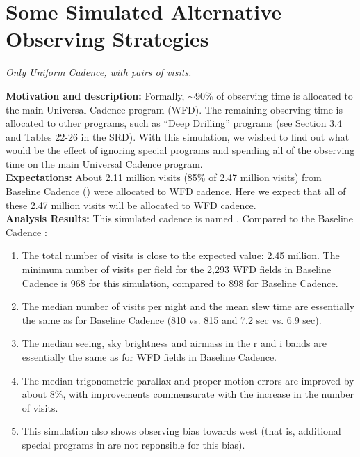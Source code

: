 \navigationbar


\section{Some Simulated Alternative Observing Strategies}
\def\secname{cadexp:alternatives}\label{sec:\secname}



{\it Only Uniform Cadence, with pairs of visits.}

{\bf Motivation and description:} Formally, $\sim$90\% of observing
time is allocated to the main Universal Cadence program (WFD). The
remaining observing time is allocated to other programs, such as
``Deep Drilling'' programs (see Section 3.4 and Tables 22-26  in the
SRD). With this simulation, we wished to find out what would be the
effect of ignoring special programs and spending all of the observing
time on the main Universal Cadence program. \\

{\bf Expectations:} About 2.11 million visits (85\% of 2.47 million
visits) from Baseline Cadence () were allocated
to WFD cadence. Here we expect that all of these 2.47 million visits
will be allocated to WFD cadence. \\

{\bf Analysis Results:} This simulated cadence is named .
Compared to the Baseline Cadence :
\begin{enumerate}
\item The total number of visits is close to the expected value: 2.45 million.
The minimum number of visits per field for the 2,293 WFD fields in Baseline Cadence
is 968 for this simulation, compared to 898 for Baseline Cadence.
\item The median number of visits per night and the mean slew time are
essentially the same as for Baseline Cadence (810 vs. 815 and 7.2 sec vs. 6.9 sec).
\item The median seeing, sky brightness and airmass in the r and i bands are
      essentially the same as for WFD fields in Baseline Cadence.
\item The median trigonometric parallax and proper motion errors are improved by
about 8\%, with improvements commensurate with the increase in the number of visits.
\item This simulation also shows observing bias towards west (that is, additional
special programs in  are not reponsible for this bias).
\end{enumerate}


